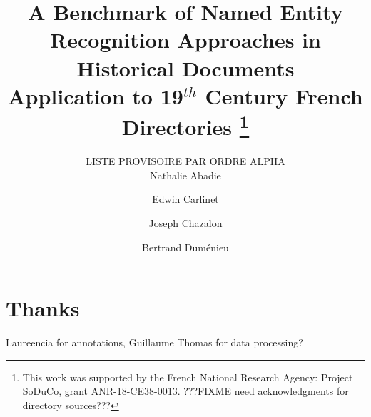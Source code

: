 \documentclass[runningheads,svgnames]{llncs}
\begin{document}
%
\title{A Benchmark of Named Entity Recognition Approaches in Historical Documents\\
Application to 19$^{th}$ Century French Directories%
\thanks{This work was supported by the French National Research Agency:
Project SoDuCo, grant ANR-18-CE38-0013. ???FIXME need acknowledgments for directory sources???}}
%
%
\author{LISTE PROVISOIRE PAR ORDRE ALPHA\\
%
Nathalie Abadie \and
Edwin Carlinet \and
Joseph Chazalon \and
Bertrand Duménieu}
%
%
%
\maketitle              %
%
\begin{abstract}

\end{abstract}









\section*{Thanks}
Laureencia for annotations, Guillaume Thomas for data processing?



\end{document}
